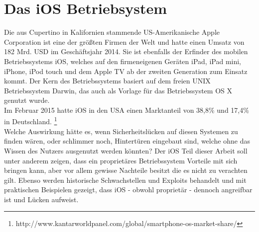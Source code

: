 \section{Das iOS Betriebsystem}
	Die aus Cupertino in Kalifornien stammende US-Amerikanische Apple Corporation
	ist eine der größten Firmen der Welt und hatte einen Umsatz von 182 Mrd.
	USD im Geschäftsjahr 2014. Sie ist ebenfalls der Erfinder des mobilen
	Betriebssystems iOS, welches auf den firmeneigenen Geräten iPad, iPad mini,
	iPhone, iPod touch und dem Apple TV ab der zweiten Generation zum Einsatz kommt.
	Der Kern des Betriebssystems basiert auf dem freien UNIX Betriebssystem Darwin,
	das auch als Vorlage für das Betriebssystem OS X genutzt wurde.\\
	Im Februar 2015 hatte iOS in den USA einen Marktanteil von 38,8\% und 17,4\%
	in Deutschland.
	\footnote{http://www.kantarworldpanel.com/global/smartphone-os-market-share/}\\
	Welche Auswirkung hätte es, wenn Sicherheitslücken auf diesen Systemen zu
	finden wären, oder schlimmer noch, Hintertüren eingebaut sind, welche ohne das
	Wissen des Nutzers ausgenutzt werden könnten? Der iOS Teil dieser Arbeit soll unter
	anderem zeigen, dass ein proprietäres Betriebssystem Vorteile mit sich
	bringen kann, aber vor allem gewisse Nachteile besitzt die es nicht zu
	verachten gilt.	Ebenso werden historische Schwachstellen und Exploits
	behandelt und mit praktischen Beispielen gezeigt, dass iOS - obwohl proprietär
	- dennoch angreifbar ist und Lücken aufweist.
